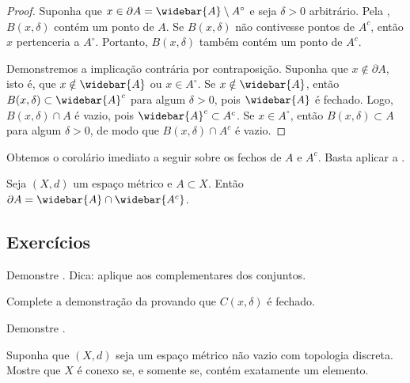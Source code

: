 \begin{proof}
Suponha que $x \in \partial A = \widebar{A} \setminus A^\circ$ e
seja $\delta > 0$ arbitrário.
Pela , $B(x,\delta)$ contém
um ponto de $A$. Se $B(x,\delta)$ não contivesse pontos de $A^c$,
então $x$ pertenceria a $A^\circ$. Portanto, $B(x,\delta)$ também contém
um ponto de $A^c$.

Demonstremos a implicação contrária por contraposição.
Suponha que $x \notin \partial A$, isto é, que $x \notin \widebar{A}$ ou
$x \in A^\circ$.
Se $x \notin \widebar{A}$, então
$B(x,\delta) \subset \widebar{A}^c$
para algum $\delta > 0$, pois $\widebar{A}$ é fechado.
Logo, $B(x,\delta) \cap A$ é vazio, pois $\widebar{A}^c \subset
A^c$.
Se $x \in A^\circ$, então
$B(x,\delta) \subset A$ para algum $\delta > 0$,
de modo que $B(x,\delta) \cap A^c$ é vazio.
\end{proof}

Obtemos o corolário imediato a seguir sobre os fechos de $A$ e $A^c$.
Basta aplicar a .

\begin{cor}
Seja $(X,d)$ um espaço métrico e $A \subset X$.
Então $\partial A = \widebar{A} \cap \widebar{A^c}$.
\end{cor}

\subsection{Exercícios}

\begin{exercise}
Demonstre . Dica:
aplique  aos complementares dos conjuntos.
\end{exercise}

\begin{exercise}
Complete a demonstração da 
provando que $C(x,\delta)$ é fechado.
\end{exercise}

\begin{exercise}
Demonstre .
\end{exercise}

\begin{exercise}
Suponha que $(X,d)$ seja um espaço métrico não vazio com topologia discreta.
Mostre que $X$ é conexo se, e somente se, contém exatamente um elemento.
\end{exercise}

